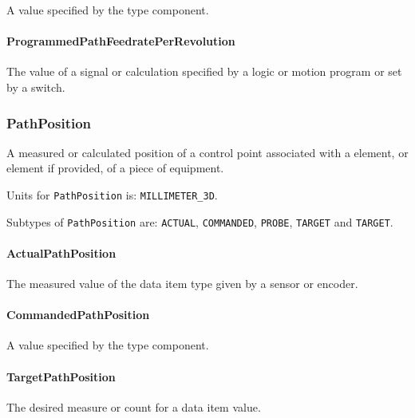 A value specified by the  type component.


\paragraph{ProgrammedPathFeedratePerRevolution}\mbox{}
\label{sec:ProgrammedPathFeedratePerRevolution}



The value of a signal or calculation specified by a logic or motion program or set by a switch.


\subsubsection{PathPosition}
\label{sec:PathPosition}



A measured or calculated position of a control point associated with a  element, or  element if provided, of a piece of equipment.


Units for \texttt{PathPosition} is: \texttt{MILLIMETER_3D}.


Subtypes of \texttt{PathPosition} are: \texttt{ACTUAL}, \texttt{COMMANDED}, \texttt{PROBE}, \texttt{TARGET} and \texttt{TARGET}. 
\FloatBarrier

\paragraph{ActualPathPosition}\mbox{}
\label{sec:ActualPathPosition}



The measured value of the data item type given by a sensor or encoder.


\paragraph{CommandedPathPosition}\mbox{}
\label{sec:CommandedPathPosition}



A value specified by the  type component.


\paragraph{TargetPathPosition}\mbox{}
\label{sec:TargetPathPosition}



The desired measure or count for a data item value.


